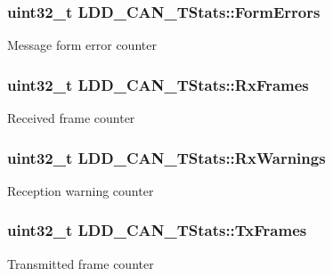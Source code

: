 \subsubsection[{Form\+Errors}]{\setlength{\rightskip}{0pt plus 5cm}uint32\+\_\+t L\+D\+D\+\_\+\+C\+A\+N\+\_\+\+T\+Stats\+::\+Form\+Errors}\label{struct_l_d_d___c_a_n___t_stats_a0d783d7e8813ded41cdac8181bab524a}
Message form error counter \hypertarget{struct_l_d_d___c_a_n___t_stats_ad5fce5f144966e6ef1ebd3559573c5cc}{}
\subsubsection[{Rx\+Frames}]{\setlength{\rightskip}{0pt plus 5cm}uint32\+\_\+t L\+D\+D\+\_\+\+C\+A\+N\+\_\+\+T\+Stats\+::\+Rx\+Frames}\label{struct_l_d_d___c_a_n___t_stats_ad5fce5f144966e6ef1ebd3559573c5cc}
Received frame counter \hypertarget{struct_l_d_d___c_a_n___t_stats_a9454eaee94ea556f10485bd8608bf980}{}
\subsubsection[{Rx\+Warnings}]{\setlength{\rightskip}{0pt plus 5cm}uint32\+\_\+t L\+D\+D\+\_\+\+C\+A\+N\+\_\+\+T\+Stats\+::\+Rx\+Warnings}\label{struct_l_d_d___c_a_n___t_stats_a9454eaee94ea556f10485bd8608bf980}
Reception warning counter \hypertarget{struct_l_d_d___c_a_n___t_stats_ad6e8656da94718393be3b05ef07a5fe0}{}
\subsubsection[{Tx\+Frames}]{\setlength{\rightskip}{0pt plus 5cm}uint32\+\_\+t L\+D\+D\+\_\+\+C\+A\+N\+\_\+\+T\+Stats\+::\+Tx\+Frames}\label{struct_l_d_d___c_a_n___t_stats_ad6e8656da94718393be3b05ef07a5fe0}
Transmitted frame counter \hypertarget{struct_l_d_d___c_a_n___t_stats_a46ea9a5839da88b7e7b596ac34b72f90}{}
